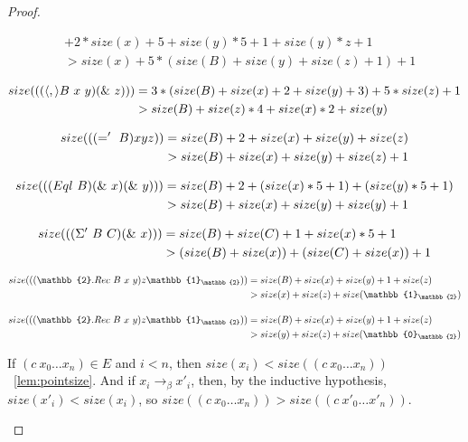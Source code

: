 \documentclass{lmcs}
\newcommand{\arr}{\rightarrow}
\newcommand{\barr}{\arr_{\beta}}
\begin{document}
\begin{proof}
\begin{description}
\begin{align*}
      & + 2*size(x) + 5 + size(y) * 5 + 1 + size(y) * z + 1\\
      & > size(x) + 5 * (size(B) + size(y) + size(z) + 1) + 1
    \end{align*}
  \item[Pair]
      \begin{align*}
        size((\comb[\langle , \rangle B][x][y] \comb[\&][z])) &= 3 * (size(B) + size(x) + 2 + size(y) + 3) + 5 * size(z) + 1\\
        & > size(B) + size(z) * 4 + size(x) * 2 + size(y)
      \end{align*}
  \item[Eq']
  \begin{align*}
    size((\comb[='][B] x y z)) &= size(B) + 2 + size(x) + size(y) + size(z)\\
    & > size(B) + size(x) + size(y) + size(z) + 1
  \end{align*}
  \item[Eql]
  \begin{align*}
    size((\comb[Eql][B] \comb[\&][x] \comb[\&][y])) &= size(B) + 2 + (size(x) * 5 + 1) + (size(y) * 5 + 1)\\
    & > size(B) + size(x) + size(y) + size(y) + 1
  \end{align*}
  \item[Sigma']
  \begin{align*}
    size((\comb[\Sigma'][B][C] \comb[\&][x])) &= size(B) + size(C) + 1 + size(x) * 5 + 1\\
    &> (size(B) + size(x)) + (size(C) + size(x)) + 1
  \end{align*}
  \item[Bool Recl.]
  \begin{align*}
    size((\comb[\mathbb{2}.Rec][B][x][y] z \mathbb{1}_\mathbb{2})) &= size(B) + size(x) + size(y) + 1 + size(z)\\
    &> size(x) + size(z) + size(\mathbb{1}_\mathbb{2})
  \end{align*}
  \item[Bool Recr.]
  \begin{align*}
    size((\comb[\mathbb{2}.Rec][B][x][y] z \mathbb{1}_\mathbb{2})) &= size(B) + size(x) + size(y) + 1 + size(z)\\
    &> size(y) + size(z) + size(\mathbb{0}_\mathbb{2})
  \end{align*}
  \item[Point]
  If \((c\ x_0 \ldots x_n) \in E\) and \(i < n\), then \(size(x_i) < size((c\ x_0 \ldots x_n))\)~\ref{lem:pointsize}. And if \(x_i \barr x'_i\), then, by the inductive hypothesis, \(size(x'_i) < size(x_i)\), so \(size((c\ x_0 \ldots x_n)) > size((c\ x'_0 \ldots x'_n))\).

\end{description}
\end{proof}
\end{document}

